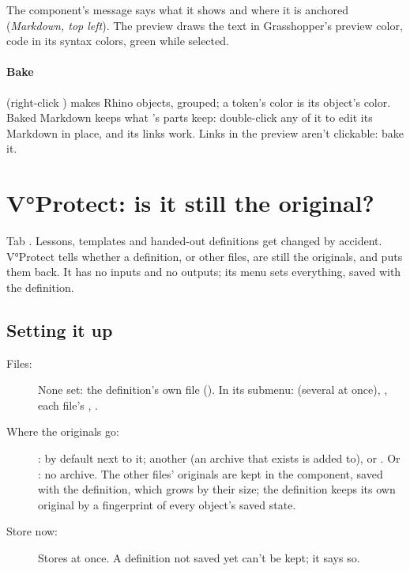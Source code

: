 The component's message says what it shows and where it is anchored (\emph{Markdown, top left}). The preview draws the text
in Grasshopper's preview color, code in its syntax colors, green while selected.

\paragraph{Bake} (right-click ) makes Rhino objects, grouped; a token's color is its object's color. Baked Markdown
keeps what 's parts keep: double-click any of it to edit its Markdown in place, and its links work. Links in
the preview aren't clickable: bake it.

\section{V°Protect: is it still the original?}\label{sec:vprotect}

Tab . Lessons, templates and handed-out definitions get changed by accident. V°Protect tells
whether a definition, or other files, are still the originals, and puts them back. It has no inputs and no outputs; its
menu sets everything, saved with the definition.

\subsection{Setting it up}

\begin{description}
  \item[Files:] None set: the definition's own file (). In its submenu: 
        (several at once), , each file's , .
  \item[Where the originals go:] : by default  next to it;
         another (an archive that exists is added to), or . Or
        : no archive. The other files' originals are kept in the component, saved with the definition, which grows by
        their size; the definition keeps its own original by a fingerprint of every object's saved state.
  \item[Store now:] Stores at once. A definition not saved yet can't be kept; it says so.
\end{description}

